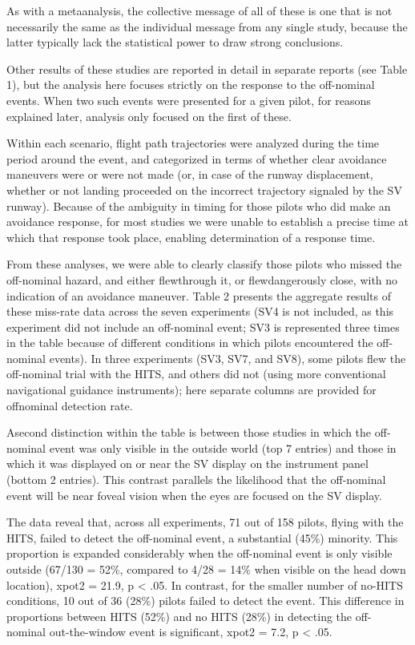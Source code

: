 \documentclass[utf8,bachelor,manualbib]{gradu3}
\begin{document}
As with a metaanalysis, the collective message of all of these is one that is not necessarily the same as the individual message from any single study, because the latter typically lack the statistical power to draw strong conclusions. \citep{wickens2009}

Other results of these studies are reported in detail in separate reports (see Table 1), but the analysis here focuses strictly on the response to the off-nominal events. When two such events were presented for a given pilot, for reasons explained later, analysis only focused on the first of these.

Within each scenario, flight path trajectories were analyzed during the time period around the event, and categorized in terms of whether clear avoidance maneuvers were or were not made (or, in case of the runway displacement, whether or not landing proceeded on the incorrect trajectory signaled by the SV runway). Because of the ambiguity in timing for those pilots who did make an avoidance response, for most studies we were unable to establish a precise time at which that response took place, enabling determination of a response time.







From these analyses, we were able to clearly classify those pilots who missed the off-nominal hazard, and either flewthrough it, or flewdangerously close, with no indication of an avoidance maneuver. Table 2 presents the aggregate results of these miss-rate data across the seven experiments (SV4 is not included, as this experiment did not include an off-nominal event; SV3 is represented three times in the table because of different conditions in which pilots encountered the off-nominal events). In three experiments (SV3, SV7, and SV8), some pilots flew the off-nominal trial with the HITS, and others did not (using more conventional navigational guidance instruments); here separate columns are provided for offnominal detection rate.

Asecond distinction within the table is between those studies in which the off-nominal event was only visible in the outside world (top 7 entries) and those in which it was displayed on or near the SV display on the instrument panel (bottom 2 entries). This contrast parallels the likelihood that the off-nominal event will be near foveal vision when the eyes are focused on the SV display.

The data reveal that, across all experiments, 71 out of 158 pilots, flying with the
HITS, failed to detect the off-nominal event, a substantial (45\%) minority. This
proportion is expanded considerably when the off-nominal event is only visible outside (67/130 = 52\%, compared to 4/28 = 14\% when visible on the head down location), xpot2 = 21.9, p < .05. In contrast, for the smaller number of no-HITS conditions, 10 out of 36 (28\%) pilots failed to detect the event. This difference in proportions between HITS (52\%) and no HITS (28\%) in detecting the off-nominal out-the-window event is significant, xpot2 = 7.2, p < .05.
\end{document}
